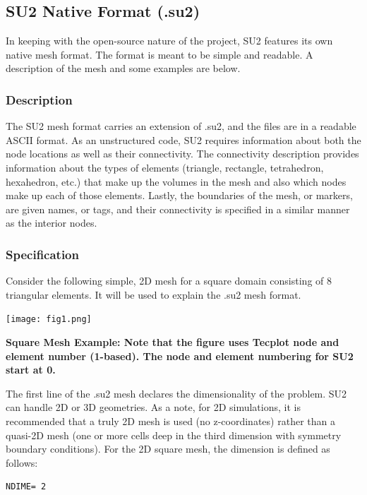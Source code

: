 \documentclass[12pt, a4paper, twoside]{article}
\begin{document}
\subsection{SU2 Native Format (.su2)}
In keeping with the open-source nature of the project, SU2 features its own native mesh format. The format is meant to be simple and readable. A description of the mesh and some examples are below.

\subsubsection{Description}

The SU2 mesh format carries an extension of .su2, and the files are in a readable ASCII format. As an unstructured code, SU2 requires information about both the node locations as well as their connectivity. The connectivity description provides information about the types of elements (triangle, rectangle, tetrahedron, hexahedron, etc.) that make up the volumes in the mesh and also which nodes make up each of those elements. Lastly, the boundaries of the mesh, or markers, are given names, or tags, and their connectivity is specified in a similar manner as the interior nodes.

\subsubsection{Specification}

Consider the following simple, 2D mesh for a square domain consisting of 8 triangular elements. It will be used to explain the .su2 mesh format.

\begin{center}
    \texttt{[image: fig1.png]}
\end{center}

\textbf{Square Mesh Example: Note that the figure uses Tecplot node and element number (1-based). The node and element numbering for SU2 start at 0.}

The first line of the .su2 mesh declares the dimensionality of the problem. SU2 can handle 2D or 3D geometries. As a note, for 2D simulations, it is recommended that a truly 2D mesh is used (no z-coordinates) rather than a quasi-2D mesh (one or more cells deep in the third dimension with symmetry boundary conditions). For the 2D square mesh, the dimension is defined as follows:

\begin{lstlisting}
NDIME= 2
\end{lstlisting}
\end{document}

